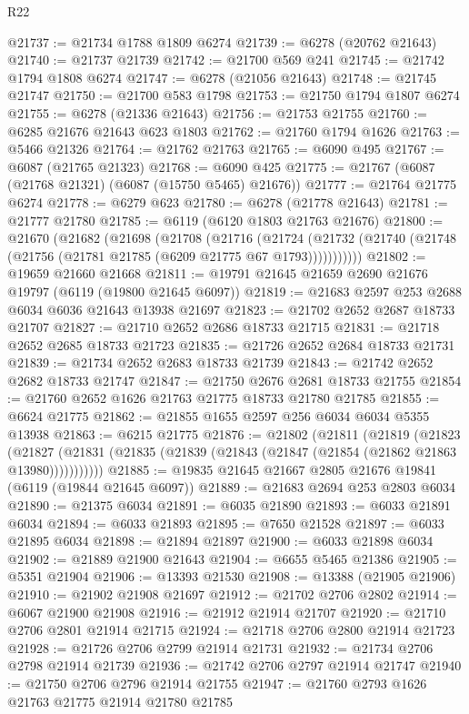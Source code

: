 \begin{lexlean}{R22}
\begin{coremodule}
@21737 := @21734 @1788 @1809 @6274
@21739 := @6278 (@20762 @21643)
@21740 := @21737 @21739
@21742 := @21700 @569 @241
@21745 := @21742 @1794 @1808 @6274
@21747 := @6278 (@21056 @21643)
@21748 := @21745 @21747
@21750 := @21700 @583 @1798
@21753 := @21750 @1794 @1807 @6274
@21755 := @6278 (@21336 @21643)
@21756 := @21753 @21755
@21760 := @6285 @21676 @21643 @623 @1803
@21762 := @21760 @1794 @1626
@21763 := @5466 @21326
@21764 := @21762 @21763
@21765 := @6090 @495
@21767 := @6087 (@21765 @21323)
@21768 := @6090 @425
@21775 := @21767 (@6087 (@21768 @21321) (@6087 (@15750 @5465) @21676))
@21777 := @21764 @21775 @6274
@21778 := @6279 @623
@21780 := @6278 (@21778 @21643)
@21781 := @21777 @21780
@21785 := @6119 (@6120 @1803 @21763 @21676)
@21800 := @21670
    (@21682
      (@21698
        (@21708
          (@21716
            (@21724
              (@21732 (@21740 (@21748 (@21756 (@21781 @21785 (@6209 @21775 @67 @1793)))))))))))
@21802 := @19659 @21660 @21668
@21811 := @19791 @21645 @21659 @2690 @21676 @19797 (@6119 (@19800 @21645 @6097))
@21819 := @21683 @2597 @253 @2688 @6034 @6036 @21643 @13938 @21697
@21823 := @21702 @2652 @2687 @18733 @21707
@21827 := @21710 @2652 @2686 @18733 @21715
@21831 := @21718 @2652 @2685 @18733 @21723
@21835 := @21726 @2652 @2684 @18733 @21731
@21839 := @21734 @2652 @2683 @18733 @21739
@21843 := @21742 @2652 @2682 @18733 @21747
@21847 := @21750 @2676 @2681 @18733 @21755
@21854 := @21760 @2652 @1626 @21763 @21775 @18733 @21780 @21785
@21855 := @6624 @21775
@21862 := @21855 @1655 @2597 @256 @6034 @6034 @5355 @13938
@21863 := @6215 @21775
@21876 := @21802
    (@21811
      (@21819
        (@21823
          (@21827 (@21831 (@21835 (@21839 (@21843 (@21847 (@21854 (@21862 @21863 @13980)))))))))))
@21885 := @19835 @21645 @21667 @2805 @21676 @19841 (@6119 (@19844 @21645 @6097))
@21889 := @21683 @2694 @253 @2803 @6034
@21890 := @21375 @6034
@21891 := @6035 @21890
@21893 := @6033 @21891 @6034
@21894 := @6033 @21893
@21895 := @7650 @21528
@21897 := @6033 @21895 @6034
@21898 := @21894 @21897
@21900 := @6033 @21898 @6034
@21902 := @21889 @21900 @21643
@21904 := @6655 @5465 @21386
@21905 := @5351 @21904
@21906 := @13393 @21530
@21908 := @13388 (@21905 @21906)
@21910 := @21902 @21908 @21697
@21912 := @21702 @2706 @2802
@21914 := @6067 @21900 @21908
@21916 := @21912 @21914 @21707
@21920 := @21710 @2706 @2801 @21914 @21715
@21924 := @21718 @2706 @2800 @21914 @21723
@21928 := @21726 @2706 @2799 @21914 @21731
@21932 := @21734 @2706 @2798 @21914 @21739
@21936 := @21742 @2706 @2797 @21914 @21747
@21940 := @21750 @2706 @2796 @21914 @21755
@21947 := @21760 @2793 @1626 @21763 @21775 @21914 @21780 @21785

\end{coremodule}
\end{lexlean}
